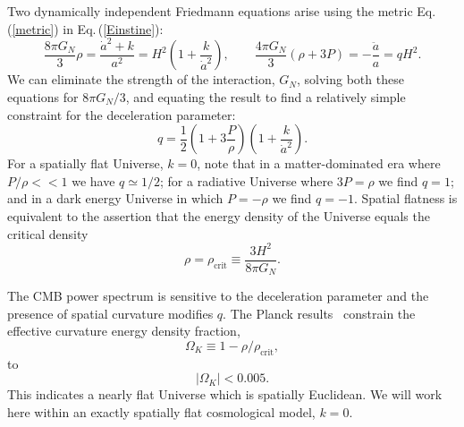 \documentclass[universe,article,submit,moreauthors,pdftex,a4paper]{Definitions/mdpi}
\newcommand{\beqn}{\begin{equation}}
\newcommand{\eeqn}{\end{equation}}
\newcommand{\req}[1]{Eq.\,(\ref{#1})}
\begin{document}
Two dynamically independent Friedmann equations arise using the metric \req{metric} in \req{Einstine}:
\beqn\label{hubble}
\frac{8\pi G_N}{3} \rho =  \frac{\dot a^2+k}{a^2}
=H^2\left( 1+\frac { k }{\dot a^2}\right),
\qquad
\frac{4\pi G_N}{3} (\rho+3P)  =-\frac{\ddot a}{a}=qH^2.
\eeqn
We can eliminate the strength of the interaction, $G_N$,  solving both these equations for ${8\pi G_N}/{3}$, and equating the result to find a relatively simple constraint for the deceleration parameter:
\beqn\label{qparam}
q=\frac 1 2 \left(1+3\frac{P}{\rho}\right)\left(1+\frac{k}{\dot a^2}\right).
\eeqn
For a spatially flat Universe, $k=0$, note that in a  matter-dominated era where $P/\rho<<1$ we have $q\simeq 1/2$; for a radiative Universe where $3P=\rho$ we find $q= 1 $; and  in a dark energy Universe in which $P=-\rho$  we find $q=-1$.  Spatial flatness is equivalent to the assertion that the energy density of the Universe equals the critical density
\begin{equation}\label{crit_density}
\rho=\rho_{\text{crit}}\equiv \frac{3H^2}{8\pi G_N}.
\end{equation}

 The CMB power spectrum is sensitive to the  deceleration parameter  and the presence of spatial curvature modifies $q$. The Planck results~\cite{Planck:2013pxb,Planck:2015fie,Planck:2018vyg} constrain  the effective curvature energy density fraction,
\begin{equation}
\Omega_K\equiv1-\rho/\rho_{\text{crit}},
\end{equation}
to
\begin{equation}
|\Omega_K|<0.005.
\end{equation}
This indicates a nearly flat Universe which is spatially Euclidean. We will work here within an exactly spatially flat cosmological model, $k=0$.  
\end{document}
